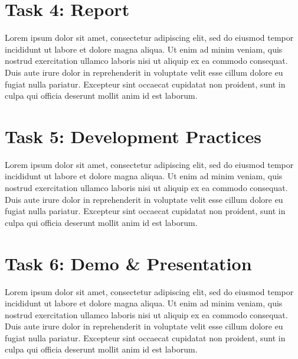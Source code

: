 \documentclass[titlepage]{article}
\begin{document}

\section*{Task 4: Report}
Lorem ipsum dolor sit amet, consectetur adipiscing elit, sed do eiusmod tempor incididunt ut labore et dolore magna aliqua. Ut enim ad minim veniam, quis nostrud exercitation ullamco laboris nisi ut aliquip ex ea commodo consequat. Duis aute irure dolor in reprehenderit in voluptate velit esse cillum dolore eu fugiat nulla pariatur. Excepteur sint occaecat cupidatat non proident, sunt in culpa qui officia deserunt mollit anim id est laborum.



\section*{Task 5: Development Practices}
Lorem ipsum dolor sit amet, consectetur adipiscing elit, sed do eiusmod tempor incididunt ut labore et dolore magna aliqua. Ut enim ad minim veniam, quis nostrud exercitation ullamco laboris nisi ut aliquip ex ea commodo consequat. Duis aute irure dolor in reprehenderit in voluptate velit esse cillum dolore eu fugiat nulla pariatur. Excepteur sint occaecat cupidatat non proident, sunt in culpa qui officia deserunt mollit anim id est laborum.
\newpage


\section*{Task 6: Demo \& Presentation}
Lorem ipsum dolor sit amet, consectetur adipiscing elit, sed do eiusmod tempor incididunt ut labore et dolore magna aliqua. Ut enim ad minim veniam, quis nostrud exercitation ullamco laboris nisi ut aliquip ex ea commodo consequat. Duis aute irure dolor in reprehenderit in voluptate velit esse cillum dolore eu fugiat nulla pariatur. Excepteur sint occaecat cupidatat non proident, sunt in culpa qui officia deserunt mollit anim id est laborum.
\end{document}
